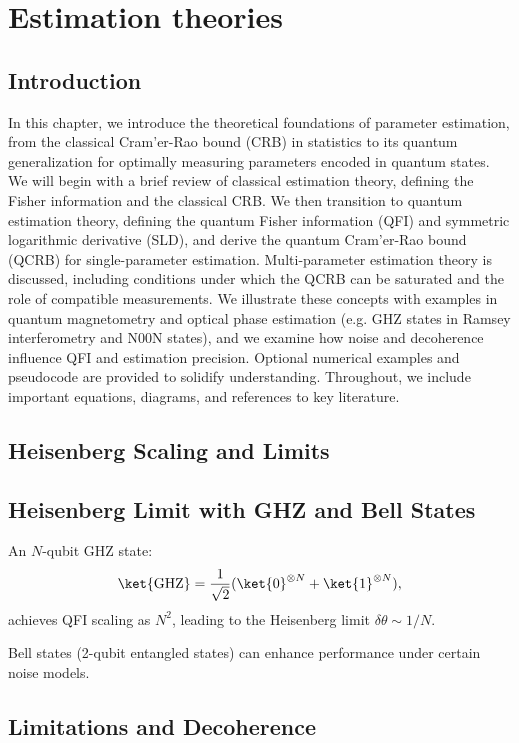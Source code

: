 \chapter{Estimation theories}

\section{Introduction}



In this chapter, we introduce the theoretical foundations
of parameter estimation, from the classical Cram'er-Rao bound (CRB) in
statistics to its quantum generalization for optimally measuring
parameters encoded in quantum states. We will begin with a brief
review of classical estimation theory, defining the Fisher information
and the classical CRB. We then transition to quantum estimation
theory, defining the quantum Fisher information (QFI) and symmetric
logarithmic derivative (SLD), and derive the quantum Cram'er-Rao bound
(QCRB) for single-parameter estimation. Multi-parameter estimation
theory is discussed, including conditions under which the QCRB can be
saturated and the role of compatible measurements. We illustrate these
concepts with examples in quantum magnetometry and optical phase
estimation (e.g. GHZ states in Ramsey interferometry and N00N states),
and we examine how noise and decoherence influence QFI and estimation
precision. Optional numerical examples and pseudocode are provided to
solidify understanding. Throughout, we include important equations,
diagrams, and references to key literature.


\section{Heisenberg Scaling and Limits}

\section{Heisenberg Limit with GHZ and Bell States}

An $N$-qubit GHZ state:
\[
\ket{\text{GHZ}} = \frac{1}{\sqrt{2}}(\ket{0}^{\otimes N} + \ket{1}^{\otimes N}),
\]
achieves QFI scaling as $N^2$, leading to the Heisenberg limit $\delta\theta \sim 1/N$.

Bell states (2-qubit entangled states) can enhance performance under
certain noise models.

\section{Limitations and Decoherence}


